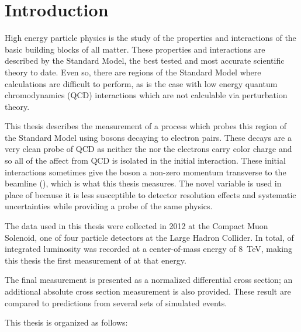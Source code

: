 \chapter{Introduction}
\label{chapter:intro}

High energy particle physics is the study of the properties and interactions of
the basic building blocks of all matter. These properties and interactions are
described by the Standard Model, the best tested and most accurate scientific
theory to date. Even so, there are regions of the Standard Model where
calculations are difficult to perform, as is the case with low energy quantum
chromodynamics (QCD) interactions which are not calculable via perturbation
theory.

This thesis describes the measurement of a process which probes this region of
the Standard Model using \Z bosons decaying to electron pairs. These decays are
a very clean probe of QCD as neither the \Z nor the electrons carry color
charge and so all of the affect from QCD is isolated in the initial
interaction. These initial interactions sometimes give the \Z boson a non-zero
momentum transverse to the beamline (\bosonpt), which is what this thesis
measures. The novel variable \phistar is used in place of \bosonpt because it
is less susceptible to detector resolution effects and systematic uncertainties
while providing a probe of the same physics.

The data used in this thesis were collected in 2012 at the Compact Muon
Solenoid, one of four particle detectors at the Large Hadron Collider. In
total, \GoodLumiNumber of integrated luminosity was recorded at a
center-of-mass energy of \SI{8}{\TeV}, making this thesis the first measurement
of \phistar at that energy.

The final measurement is presented as a normalized differential cross section;
an additional absolute cross section measurement is also provided. These result
are compared to predictions from several sets of simulated events.

This thesis is organized as follows:

